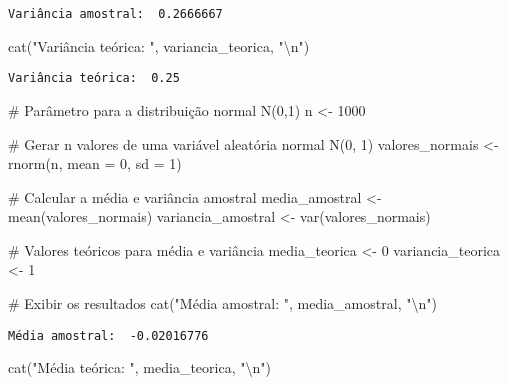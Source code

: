 \documentclass[
  letterpaper,
  DIV=11,
  numbers=noendperiod]{scrreprt}
\newenvironment{Shaded}{\begin{snugshade}}{\end{snugshade}}
\newcommand{\AttributeTok}[1]{\textcolor[rgb]{0.40,0.45,0.13}{#1}}
\newcommand{\CommentTok}[1]{\textcolor[rgb]{0.37,0.37,0.37}{#1}}
\newcommand{\DecValTok}[1]{\textcolor[rgb]{0.68,0.00,0.00}{#1}}
\newcommand{\FunctionTok}[1]{\textcolor[rgb]{0.28,0.35,0.67}{#1}}
\newcommand{\NormalTok}[1]{\textcolor[rgb]{0.00,0.23,0.31}{#1}}
\newcommand{\OtherTok}[1]{\textcolor[rgb]{0.00,0.23,0.31}{#1}}
\newcommand{\SpecialCharTok}[1]{\textcolor[rgb]{0.37,0.37,0.37}{#1}}
\newcommand{\StringTok}[1]{\textcolor[rgb]{0.13,0.47,0.30}{#1}}
\begin{document}
\begin{verbatim}
Variância amostral:  0.2666667 
\end{verbatim}

\begin{Shaded}
\begin{Highlighting}[]
\FunctionTok{cat}\NormalTok{(}\StringTok{"Variância teórica: "}\NormalTok{, variancia\_teorica, }\StringTok{"}\SpecialCharTok{\textbackslash{}n}\StringTok{"}\NormalTok{)}
\end{Highlighting}
\end{Shaded}

\begin{verbatim}
Variância teórica:  0.25 
\end{verbatim}

\begin{Shaded}
\begin{Highlighting}[]
\CommentTok{\# Parâmetro para a distribuição normal N(0,1)}
\NormalTok{n }\OtherTok{\textless{}{-}} \DecValTok{1000}

\CommentTok{\# Gerar n valores de uma variável aleatória normal N(0, 1)}
\NormalTok{valores\_normais }\OtherTok{\textless{}{-}} \FunctionTok{rnorm}\NormalTok{(n, }\AttributeTok{mean =} \DecValTok{0}\NormalTok{, }\AttributeTok{sd =} \DecValTok{1}\NormalTok{)}

\CommentTok{\# Calcular a média e variância amostral}
\NormalTok{media\_amostral }\OtherTok{\textless{}{-}} \FunctionTok{mean}\NormalTok{(valores\_normais)}
\NormalTok{variancia\_amostral }\OtherTok{\textless{}{-}} \FunctionTok{var}\NormalTok{(valores\_normais)}

\CommentTok{\# Valores teóricos para média e variância}
\NormalTok{media\_teorica }\OtherTok{\textless{}{-}} \DecValTok{0}
\NormalTok{variancia\_teorica }\OtherTok{\textless{}{-}} \DecValTok{1}

\CommentTok{\# Exibir os resultados}
\FunctionTok{cat}\NormalTok{(}\StringTok{"Média amostral: "}\NormalTok{, media\_amostral, }\StringTok{"}\SpecialCharTok{\textbackslash{}n}\StringTok{"}\NormalTok{)}
\end{Highlighting}
\end{Shaded}

\begin{verbatim}
Média amostral:  -0.02016776 
\end{verbatim}

\begin{Shaded}
\begin{Highlighting}[]
\FunctionTok{cat}\NormalTok{(}\StringTok{"Média teórica: "}\NormalTok{, media\_teorica, }\StringTok{"}\SpecialCharTok{\textbackslash{}n}\StringTok{"}\NormalTok{)}
\end{Highlighting}
\end{Shaded}
\end{document}
